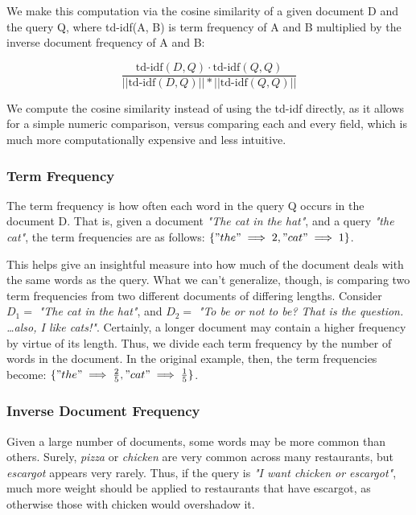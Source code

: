 \documentclass{article}
\begin{document}
        We make this computation via the cosine similarity of a given document D and the query Q, where td-idf(A, B) is term frequency of A and B multiplied by the inverse document frequency of A and B:
        
        \begin{equation}
            \frac{\text{td-idf}(D, Q) \cdot \text{td-idf}(Q, Q)}{||\text{td-idf}(D, Q) ||*||\text{td-idf}(Q, Q)||}
        \end{equation}
        
        We compute the cosine similarity instead of using the td-idf directly, as it allows for a simple numeric comparison, versus comparing each and every field, which is much more computationally expensive and less intuitive.
        
        \subsubsection{Term Frequency}
            The term frequency is how often each word in the query Q occurs in the document D. That is, given a document \textit{"The cat in the hat"}, and a query \textit{"the cat"}, the term frequencies are as follows: $\{"the" \implies 2, "cat" \implies 1\}$.
            
            This helps give an insightful measure into how much of the document deals with the same words as the query. What we can't generalize, though, is comparing two term frequencies from two different documents of differing lengths. Consider $D_1 = $ \textit{"The cat in the hat"}, and $D_2 = $ \textit{"To be or not to be? That is the question. \ldots also, I like cats!"}. Certainly, a longer document may contain a higher frequency by virtue of its length. Thus, we divide each term frequency by the number of words in the document. In the original example, then, the term frequencies become: $\{"the" \implies \frac{2}{5}, "cat" \implies \frac{1}{5}\}$.
            
        \subsubsection{Inverse Document Frequency}
            Given a large number of documents, some words may be more common than others. Surely, \textit{pizza} or \textit{chicken} are very common across many restaurants, but  \textit{escargot} appears very rarely. Thus, if the query is \textit{"I want chicken or escargot"}, much more weight should be applied to restaurants that have escargot, as otherwise those with chicken would overshadow it.
            
\end{document}
